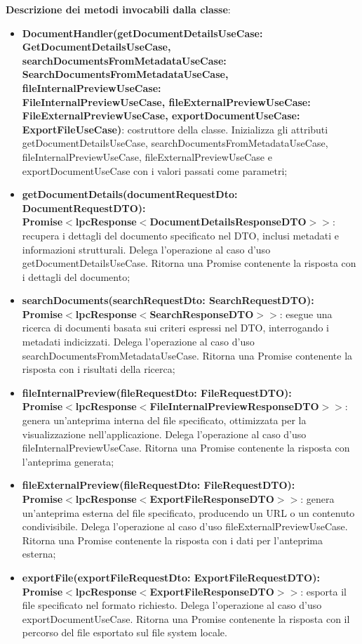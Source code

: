 \documentclass[a4paper,12pt]{article}
\begin{document}
{{{            \noindent \textbf{Descrizione dei metodi invocabili dalla classe}:
                \begin{itemize}
                    \item \textbf{DocumentHandler(getDocumentDetailsUseCase:\\ GetDocumentDetailsUseCase, searchDocumentsFromMetadataUseCase:\\ SearchDocumentsFromMetadataUseCase, fileInternalPreviewUseCase:\\ FileInternalPreviewUseCase, fileExternalPreviewUseCase:\\ FileExternalPreviewUseCase, exportDocumentUseCase:\\ ExportFileUseCase)}: costruttore della classe. Inizializza gli attributi getDocumentDetailsUseCase, searchDocumentsFromMetadataUseCase, fileInternalPreviewUseCase, fileExternalPreviewUseCase e exportDocumentUseCase con i valori passati come parametri;
                    \item \textbf{getDocumentDetails(documentRequestDto: DocumentRequestDTO):\\ Promise$<$lpcResponse$<$DocumentDetailsResponseDTO$>>$}: recupera i dettagli del documento specificato nel DTO, inclusi metadati e informazioni strutturali. Delega l'operazione al caso d'uso getDocumentDetailsUseCase. Ritorna una Promise contenente la risposta con i dettagli del documento;
                    \item \textbf{searchDocuments(searchRequestDto: SearchRequestDTO):\\ Promise$<$lpcResponse$<$SearchResponseDTO$>>$}: esegue una ricerca di documenti basata sui criteri espressi nel DTO, interrogando i metadati indicizzati. Delega l'operazione al caso d'uso searchDocumentsFromMetadataUseCase. Ritorna una Promise contenente la risposta con i risultati della ricerca;
                    \item \textbf{fileInternalPreview(fileRequestDto: FileRequestDTO):\\ Promise$<$lpcResponse$<$FileInternalPreviewResponseDTO$>>$}: genera un'anteprima interna del file specificato, ottimizzata per la visualizzazione nell'applicazione. Delega l'operazione al caso d'uso fileInternalPreviewUseCase. Ritorna una Promise contenente la risposta con l'anteprima generata;
                    \item \textbf{fileExternalPreview(fileRequestDto: FileRequestDTO):\\ Promise$<$lpcResponse$<$ExportFileResponseDTO$>>$}: genera un'anteprima esterna del file specificato, producendo un URL o un contenuto condivisibile. Delega l'operazione al caso d'uso fileExternalPreviewUseCase. Ritorna una Promise contenente la risposta con i dati per l'anteprima esterna;
                    \item \textbf{exportFile(exportFileRequestDto: ExportFileRequestDTO):\\ Promise$<$lpcResponse$<$ExportFileResponseDTO$>>$}: esporta il file specificato nel formato richiesto. Delega l'operazione al caso d'uso exportDocumentUseCase. Ritorna una Promise contenente la risposta con il percorso del file esportato sul file system locale.
                \end{itemize}
            }
            
}}
\end{document}
